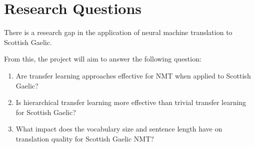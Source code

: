 
\section{Research Questions}
There is a research gap in the application of neural machine translation to Scottish Gaelic.

From this, the project will aim to answer the following question:

\begin{enumerate}
    \item Are transfer learning approaches effective for \acrshort{NMT} when applied to Scottish Gaelic?
    \item Is hierarchical transfer learning more effective than trivial transfer learning for Scottish Gaelic?
    \item What impact does the vocabulary size and sentence length have on translation quality for Scottish Gaelic \acrshort{NMT}?
\end{enumerate}
